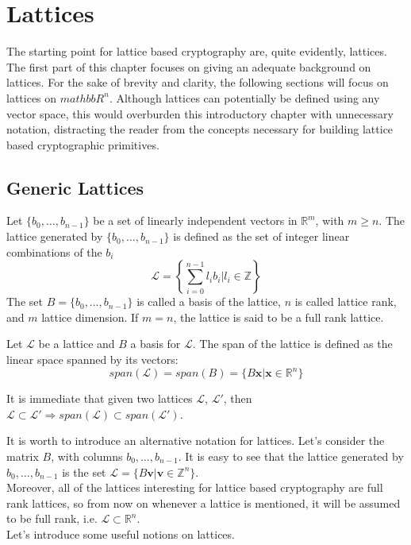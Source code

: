 \section{Lattices}

The starting point for lattice based cryptography are, quite evidently, lattices. The first part of this chapter focuses on giving an adequate background on lattices. For the sake of brevity and clarity, the following sections will focus on lattices on $mathbb{R}^n$. Although lattices can potentially be defined using any vector space, this would overburden this introductory chapter with unnecessary notation, distracting the reader from the concepts necessary for building lattice based cryptographic primitives.

\subsection{Generic Lattices}

\begin{definition}[Lattice]
Let $\{b_0,\ldots,b_{n-1}\}$ be a set of linearly independent vectors in $\mathbb{R}^m$, with $m\geq n$. The lattice generated by $\{b_0,\ldots,b_{n-1}\}$ is defined as the set of integer linear combinations of the $b_i$
\begin{equation*}
\mathscr{L}=\left\{\sum_{i=0}^{n-1}l_ib_i | l_i\in\mathbb{Z}\right\}
\end{equation*}
The set $B=\{b_0,\ldots,b_{n-1}\}$ is called a basis of the lattice, $n$ is called lattice rank, and $m$ lattice dimension. If $m=n$, the lattice is said to be a full rank lattice.
\end{definition}

\begin{definition}
Let $\mathscr{L}$ be a lattice and $B$ a basis for $\mathscr{L}$. The span of the lattice is defined as the linear space spanned by its vectors:
\begin{equation*}
span(\mathscr{L}) = span(B) = \{B\mathbf{x}|\mathbf{x}\in\mathbb{R}^n\}
\end{equation*} 
\end{definition}

\begin{remark}
It is immediate that given two lattices $\mathscr{L}$, $\mathscr{L}'$, then $\mathscr{L}\subset \mathscr{L}' \Rightarrow span(\mathscr{L}) \subset span(\mathscr{L}')$.
\end{remark}

It is worth to introduce an alternative notation for lattices. Let's consider the matrix $B$, with columns $b_0,\ldots,b_{n-1}$. It is easy to see that the lattice generated by $b_0,\ldots,b_{n-1}$ is the set $\mathscr{L}=\{B\mathbf{v}|\mathbf{v}\in\mathbb{Z}^n\}$.\\
Moreover, all of the lattices interesting for lattice based cryptography are full rank lattices, so from now on whenever a lattice is mentioned, it will be assumed to be full rank, i.e. $\mathscr{L}\subset\mathbb{R}^n$.\\
Let's introduce some useful notions on lattices.

